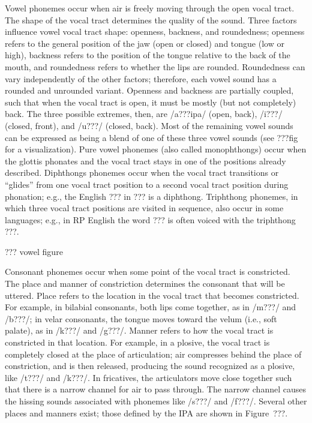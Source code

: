 Vowel phonemes occur when air is freely
moving through the open vocal tract.
The shape of the vocal tract determines
the quality of the sound.
Three factors influence vowel vocal tract shape:
openness, backness, and roundedness;
openness refers to the general position
of the jaw (open or closed) and tongue (low or high),
backness refers to the position of the
tongue relative to the back of the mouth,
and roundedness refers to
whether the lips are rounded.
Roundedness can vary independently
of the other factors;
therefore, each vowel sound has a rounded
and unrounded variant.
Openness and backness are partially coupled,
such that when the vocal tract is open,
it must be mostly (but not completely) back.
The three possible extremes, then,
are /a???ipa/ (open, back),
/i???/ (closed, front),
and /u???/ (closed, back).
Most of the remaining vowel sounds
can be expressed as being
a blend of one of these three vowel sounds
(see ???fig for a visualization).
Pure vowel phonemes (also called monophthongs)
occur when the glottis phonates
and the vocal tract stays
in one of the positions already described.
Diphthongs phonemes occur
when the vocal tract
transitions or ``glides''
from one vocal tract position
to a second vocal tract position
during phonation;
e.g., the English ???
in ??? is a diphthong.
Triphthong phonemes,
in which three vocal tract positions
are visited in sequence,
also occur in some languages;
e.g., in RP English
the word ???
is often voiced with the
triphthong ???.

??? vowel figure

Consonant phonemes occur when some point
of the vocal tract is constricted.
The place and manner of constriction
determines the consonant that will be uttered.
Place refers to the location in the vocal tract
that becomes constricted.
For example, in bilabial consonants,
both lips come together,
as in /m???/ and /b???/;
in velar consonants,
the tongue moves toward the velum
(i.e., soft palate),
as in /k???/ and /g???/.
Manner refers to how the vocal tract
is constricted in that location.
For example, in a plosive,
the vocal tract is completely closed
at the place of articulation;
air compresses behind the place of constriction,
and is then released,
producing the sound recognized
as a plosive, like /t???/ and /k???/.
In fricatives,
the articulators move close together
such that there is a narrow channel
for air to pass through.
The narrow channel causes
the hissing sounds associated
with phonemes like /s???/ and /f???/.
Several other places and manners exist;
those defined by the IPA are shown in Figure~???.

